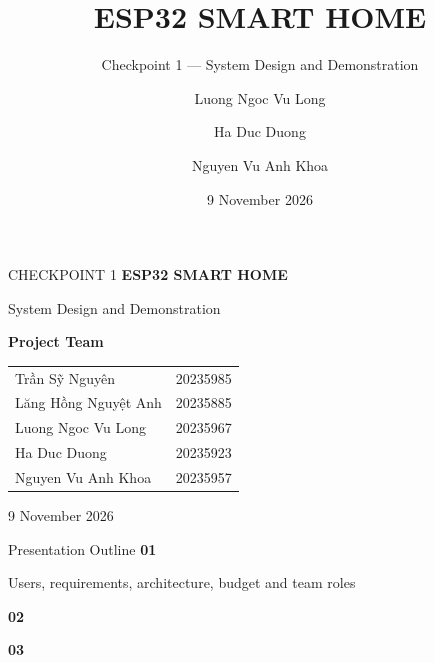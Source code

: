 \documentclass[aspectratio=169,11pt]{beamer}
\title{ESP32 SMART HOME}
\subtitle{Checkpoint 1 --- System Design and Demonstration}
\author{\VNname{Trần Sỹ Nguyên} \and \VNname{Lăng Hồng Nguyệt Anh} \and Luong Ngoc Vu Long \and Ha Duc Duong \and Nguyen Vu Anh Khoa}
\date{9 November 2026}
\renewcommand{\arraystretch}{1.18}
\newcommand{\GroupName}{Project Team}
\newcommand{\VNname}[1]{{\fontencoding{T5}\selectfont #1}}
\begin{document}
\begin{frame}{CHECKPOINT 1}
  \begingroup
  \setlength{\parskip}{0pt}
  \vfill
  {\fontsize{28}{32}\selectfont\color{DeepBlue}\bfseries ESP32 SMART HOME}\par
  \vspace{0.18cm}
  {\large System Design and Demonstration}\par
  \vspace{0.45cm}
  {\normalsize\bfseries \GroupName}\par
  \vspace{0.15cm}
  {\small\renewcommand{\arraystretch}{1.3}
    \begin{tabular}{@{}p{5.1cm}r@{}}
      \VNname{Trần Sỹ Nguyên} & 20235985 \\
      \VNname{Lăng Hồng Nguyệt Anh} & 20235885 \\
      Luong Ngoc Vu Long & 20235967 \\
      Ha Duc Duong & 20235923 \\
      Nguyen Vu Anh Khoa & 20235957 \\
    \end{tabular}\par
  }
  \vspace{0.3cm}
  {\small 9 November 2026}
  \vfill
  \endgroup
\end{frame}

\begin{frame}{Presentation Outline}
  \vfill
  {\Large\bfseries\color{AccentRed} 01}\par
  {\small\hspace{1.0cm} Users, requirements, architecture, budget and team roles}\par
  \vspace{0.55cm}
  {\Large\bfseries\color{AccentRed} 02}\par
  \vspace{0.55cm}
  {\Large\bfseries\color{AccentRed} 03}\par
  \vfill
\end{frame}
\end{document}
